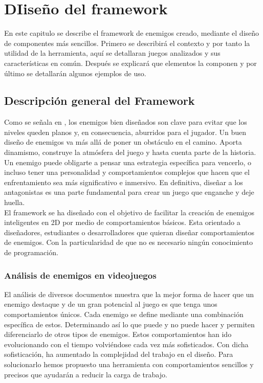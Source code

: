 
\chapter{DIiseño del framework}
\label{cap:descripcionTrabajo}
En este capitulo se describe el framework de enemigos creado, mediante el diseño de componentes más sencillos. 
Primero se describirá el contexto y por tanto la utilidad de la herramienta, aquí se detallaran juegos analizados y sus características en común. Después se explicará que elementos la componen y por último se detallarán algunos ejemplos de uso. \\
\section{Descripción general del Framework}
Como se señala en  \citet{Build_a_Bad_Guy_Workshop}, los enemigos bien diseñados son clave para evitar que los niveles queden planos y, en consecuencia, aburridos para el jugador.
Un buen diseño de enemigos va más allá de poner un obstáculo en el camino. Aporta dinamismo, construye la atmósfera del juego y hasta cuenta parte de la historia. Un enemigo puede obligarte a pensar una estrategia específica para vencerlo, o incluso tener una personalidad y comportamientos complejos que hacen que el enfrentamiento sea más significativo e inmersivo. En definitiva, diseñar a los antagonistas es una parte fundamental para crear un juego que enganche y deje huella.\\

El framework se ha diseñado con el objetivo de facilitar la creación de enemigos inteligentes en 2D por medio de comportamientos básicos. Esta orientado a diseñadores, estudiantes o desarrolladores que quieran diseñar comportamientos de enemigos. Con la particularidad de que no es necesario ningún conocimiento de programación.

\subsection{Análisis de enemigos en videojuegos}
El análisis de diversos documentos muestra que la mejor forma de hacer que un enemigo destaque y de un gran potencial al juego es que tenga unos comportamientos únicos.  Cada enemigo se define mediante una combinación específica de estos. Determinando así lo que puede y no puede hacer  y permiten diferenciarlo de otros tipos de enemigos. Estos comportamientos han ido evolucionando con el tiempo volviéndose cada vez más sofisticados.  Con dicha sofisticación, ha aumentado la complejidad del trabajo en el diseño. Para solucionarlo hemos propuesto una herramienta con comportamientos sencillos y precisos que ayudarán a reducir la carga de trabajo. 

